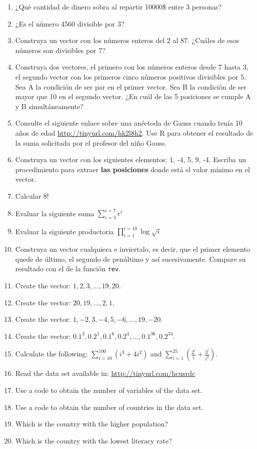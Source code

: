 \documentclass[10pt,]{krantz}
\providecommand{\tightlist}{%
  \setlength{\itemsep}{0pt}\setlength{\parskip}{0pt}}
\begin{document}
\begin{enumerate}
\def\labelenumi{\arabic{enumi}.}
\tightlist
\item
  ¿Qué cantidad de dinero sobra al repartir 10000\$ entre 3 personas?
\item
  ¿Es el número 4560 divisible por 3?
\item
  Construya un vector con los números enteros del 2 al 87. ¿Cuáles de
  esos números son divisibles por 7?
\item
  Construya dos vectores, el primero con los números enteros desde 7
  hasta 3, el segundo vector con los primeros cinco números positivos
  divisibles por 5. Sea A la condición de ser par en el primer vector.
  Sea B la condición de ser mayor que 10 en el segundo vector. ¿En cuál
  de las 5 posiciones se cumple A y B simultáneamente?
\item
  Consulte el siguiente enlace sobre una anéctoda de Gauss cuando tenía
  10 años de edad \url{http://tinyurl.com/hk2l8h2}. Use R para obtener
  el resultado de la suma solicitada por el profesor del niño Gauss.
\item
  Construya un vector con los siguientes elementos: 1, -4, 5, 9, -4.
  Escriba un procedimiento para extraer \textbf{las posiciones} donde
  está el valor mínimo en el vector.
\item
  Calcular \(8!\)
\item
  Evaluar la siguiente suma \(\sum_{i=3}^{i=7}e^i\)
\item
  Evaluar la siguiente productoria \(\prod_{i=1}^{i=10}\log\sqrt{i}\)
\item
  Construya un vector cualquiera e inviertalo, es decir, que el primer
  elemento quede de último, el segundo de penúltimo y así sucesivamente.
  Compare su resultado con el de la función \texttt{rev}.
\item
  Create the vector: \(1, 2, 3, \ldots, 19, 20\).
\item
  Create the vector: \(20, 19, \ldots , 2, 1\).
\item
  Create the vector: \(1, -2, 3, -4, 5, -6, \ldots, 19, -20\).
\item
  Create the vector:
  \(0.1^3, 0.2^1, 0.1^6, 0.2^4, . . . , 0.1^{36}, 0.2^{34}\).
\item
  Calculate the following: \(\sum_{i=10}^{100}(i^3+4i^2)\) and
  \(\sum_{i=1}^{25}\left( \frac{2^i}{i} + \frac{3^i}{i^2} \right)\).
\item
  Read the data set available in: \url{http://tinyurl.com/hcusrdc}
\item
  Use a code to obtain the number of variables of the data set.
\item
  Use a code to obtain the number of countries in the data set.
\item
  Which is the country with the higher population?
\item
  Which is the country with the lowest literacy rate?
\end{enumerate}
\end{document}

